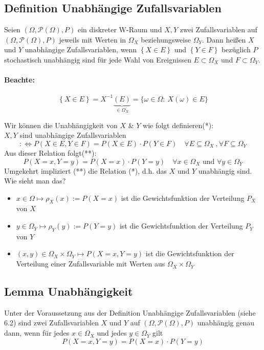 \documentclass[12pt,a4paper]{article}
\begin{document}
	\subsection{Definition Unabhängige Zufallsvariablen}
	\label{sec6.2}
	Seien $(\Omega,\mathcal{P}(\Omega),P)$ ein diskreter W-Raum und $X,Y$ zwei Zufallsvariablen auf $(\Omega,\mathcal{P}(\Omega),P)$ jeweils mit Werten in $\Omega_X$ beziehungsweise $\Omega_Y$. Dann heißen $X$ und $Y$ unabhängige Zufallsvariablen, wenn $\left\{X\in E\right\}$ und $\left\{Y\in F\right\}$ bezüglich $P$ stochastisch unabhängig sind für jede Wahl von Ereignissen $E\subset\Omega_X$ und $F\subset\Omega_Y$.
	\paragraph{Beachte:}
	$$\left\{X\in E\right\}=X^{-1}\underbrace{\left(E\right)}_{\in\Omega_X}=\{\omega\in\Omega:\: X(\omega)\in E\}$$  

	Wir können die Unabhängigkeit von $X$ \& $Y$ wie folgt definieren(*):\\
	$X,Y$ sind unabhängige Zufallsvariablen 
	$$:\Leftrightarrow P(X\in E, Y\in F) = P(X\in E) \cdot P(Y\in F) \quad 	\forall E\subseteq\Omega_X \: , \forall F\subseteq\Omega_Y$$
	Aus dieser Relation folgt(**):
	$$P(X=x,Y=y)=P(X=x)\cdot P(Y=y) \quad \forall x\in\Omega_X \text{ und } \forall y\in\Omega_Y $$
	Umgekehrt impliziert (**) die Relation (*), d.h. das $X$ und $Y$ unabhängig sind. Wie sieht man das?
	\begin{itemize}
	\item $x\in\Omega\longmapsto\rho_X (x):=P(X=x)$ ist die Gewichtsfunktion der Verteilung  $P_X$ von $X$
	\item $y\in\Omega_Y\longmapsto\rho_Y(y):=P(Y=y)$ ist die Gewichtsfunktion der Verteilung $P_Y$ von $Y$
	\item $(x,y)\in\Omega_X \times \Omega_Y\longmapsto P(X=x,Y=y)$ ist die Gewichtsfunktion der Verteilung einer Zufallsvariable mit Werten aus $\Omega_X \times \Omega_Y$
	\end{itemize}
	\subsection{Lemma Unabhängigkeit}
	Unter der Voraussetzung aus der Definition Unabhängige Zufallsvariablen (siehe 6.2) sind zwei Zufallsvariablen $X$ und $Y$ auf $(\Omega,\mathcal{P}(\Omega),P)$ unabhängig genau dann, wenn für jedes $x\in\Omega_X$ und jedes $y\in\Omega_Y$ gilt
	$$P(X=x,Y=y)=P(X=x)\cdot P(Y=y)$$
\end{document}

